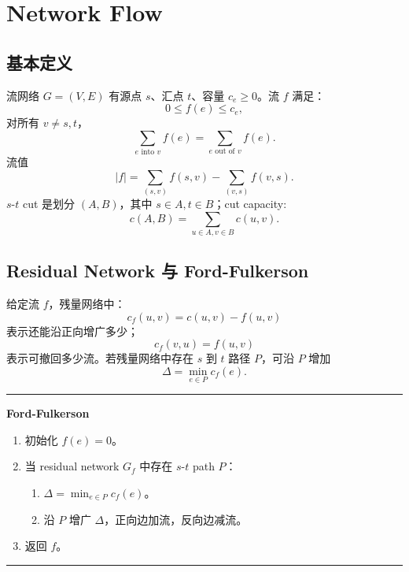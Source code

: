 \documentclass[UTF8,a4paper,11pt]{ctexart}
\newenvironment{algobox}[1]
{\par\medskip\noindent\begin{minipage}{0.96\linewidth}\hrule\vspace{0.35em}\textbf{#1}\par\vspace{0.25em}\small}
{\par\vspace{0.25em}\hrule\end{minipage}\par\medskip}
\begin{document}
\section{Network Flow}

\subsection{基本定义}

流网络 $G=(V,E)$ 有源点 $s$、汇点 $t$、容量 $c_e\ge 0$。流 $f$ 满足：
\[
0\le f(e)\le c_e,
\]
对所有 $v\ne s,t$，
\[
\sum_{e\text{ into }v}f(e)=\sum_{e\text{ out of }v}f(e).
\]
流值
\[
|f|=\sum_{(s,v)}f(s,v)-\sum_{(v,s)}f(v,s).
\]
$s$-$t$ cut 是划分 $(A,B)$，其中 $s\in A,t\in B$；cut capacity:
\[
c(A,B)=\sum_{u\in A,v\in B}c(u,v).
\]

\subsection{Residual Network 与 Ford-Fulkerson}

给定流 $f$，残量网络中：
\[
c_f(u,v)=c(u,v)-f(u,v)
\]
表示还能沿正向增广多少；
\[
c_f(v,u)=f(u,v)
\]
表示可撤回多少流。若残量网络中存在 $s$ 到 $t$ 路径 $P$，可沿 $P$ 增加
\[
\Delta=\min_{e\in P}c_f(e).
\]

\begin{algobox}{Ford-Fulkerson}
\begin{enumerate}
  \item 初始化 $f(e)=0$。
  \item 当 residual network $G_f$ 中存在 $s$-$t$ path $P$：
  \begin{enumerate}
    \item $\Delta=\min_{e\in P}c_f(e)$。
    \item 沿 $P$ 增广 $\Delta$，正向边加流，反向边减流。
  \end{enumerate}
  \item 返回 $f$。
\end{enumerate}
\end{algobox}

\begin{center}
\end{center}
\end{document}
